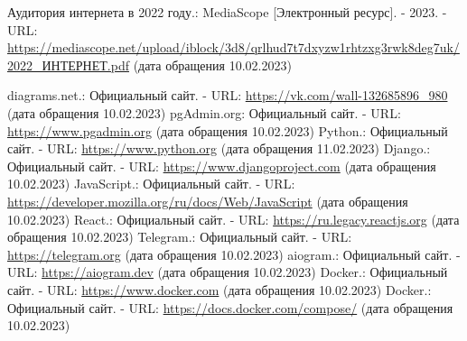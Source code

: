 \documentclass[14pt]{extreport}
\begin{document}
\pagestyle{empty} %

\pagestyle{plain} %

\tableofcontents



    






        

% 
% 

\newpage
    \begin{thebibliography}{99}
         Аудитория интернета в 2022 году.: %
        MediaScope [Электронный ресурс]. - 2023. - URL: %
        \url{https://mediascope.net/upload/iblock/3d8/qrlhud7t7dxyzw1rhtzxg3rwk8deg7uk/2022_ИНТЕРНЕТ.pdf} %
        (дата обращения 10.02.2023)

         diagrams.net.: Официальный сайт. - %
        URL: \url{https://vk.com/wall-132685896_980} (дата обращения 10.02.2023)
         pgAdmin.org: Официальный сайт. - %
        URL: \url{https://www.pgadmin.org} (дата обращения 10.02.2023)
         Python.: Официальный сайт. - %
        URL: \url{https://www.python.org} (дата обращения 11.02.2023)
         Django.: Официальный сайт. - %
        URL: \url{https://www.djangoproject.com} (дата обращения 10.02.2023)
         JavaScript.: Официальный сайт. - %
        URL: \url{https://developer.mozilla.org/ru/docs/Web/JavaScript} (дата обращения 10.02.2023)
         React.: Официальный сайт. - %
        URL: \url{https://ru.legacy.reactjs.org} (дата обращения 10.02.2023) 
         Telegram.: Официальный сайт. - %
        URL: \url{https://telegram.org} (дата обращения 10.02.2023) 
         aiogram.: Официальный сайт. - %
        URL: \url{https://aiogram.dev} (дата обращения 10.02.2023) 
         Docker.: Официальный сайт. - %
        URL: \url{https://www.docker.com} (дата обращения 10.02.2023) 
         Docker.: Официальный сайт. - %
        URL: \url{https://docs.docker.com/compose/} (дата обращения 10.02.2023) 
        
    \end{thebibliography}
\end{document}
